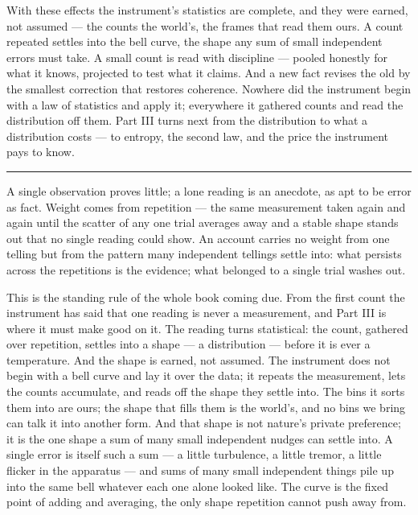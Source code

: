 \bigskip

With these effects the instrument's statistics are complete, and they were earned, not assumed --- the
counts the world's, the frames that read them ours. A count
repeated settles into the bell curve, the shape any sum of small independent errors must take. A small count
is read with discipline --- pooled honestly for what it knows, projected to test what it claims. And a new
fact revises the old by the smallest correction that restores coherence. Nowhere did the instrument begin with
a law of statistics and apply it; everywhere it gathered counts and read the distribution off them. Part III
turns next from the distribution to what a distribution costs --- to entropy, the second law, and the price
the instrument pays to know.

\bigskip
\begin{center}
\rule{0.4\textwidth}{0.4pt}
\end{center}
\bigskip

\noindent A single observation proves little; a lone reading is an anecdote, as apt to be error as fact.
Weight comes from repetition --- the same measurement taken again and again until the scatter of any one trial
averages away and a stable shape stands out that no single reading could show. An account carries no weight from
one telling but from the pattern many independent tellings settle into: what persists across the repetitions is
the evidence; what belonged to a single trial washes out.

This is the standing rule of the whole book coming due. From the first count the instrument has said that one
reading is never a measurement, and Part III is where it must make good on it. The reading turns statistical:
the count, gathered over repetition, settles into a shape --- a distribution --- before it is ever a
temperature. And the shape is earned, not assumed. The instrument does not begin with a bell curve and lay it
over the data; it repeats the measurement, lets the counts accumulate, and reads off the shape they settle
into. The bins it sorts them into are ours; the shape that fills them is the world's, and no bins we bring can
talk it into another form. And that shape is not nature's private preference; it is the one shape a sum of many
small independent nudges can settle into. A single error is itself such a sum --- a little turbulence, a little
tremor, a little flicker in the apparatus --- and sums of many small independent things pile up into the same
bell whatever each one alone looked like. The curve is the fixed point of adding and averaging, the only shape
repetition cannot push away from.


